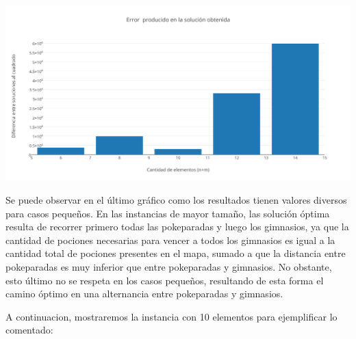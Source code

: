\vspace*{0.3cm} \vspace*{0.3cm}
  \begin{center}
\includegraphics[scale=0.40]{./EJ2/anillosdif.png}
  \end{center}
  \vspace*{0.3cm}

Se puede observar en el \'ultimo gr\'afico como los resultados tienen valores diversos para casos pequeños. En las instancias de mayor tamaño, las solución óptima resulta de recorrer primero todas las pokeparadas y luego los gimnasios, ya que la cantidad de pociones necesarias para vencer a todos los gimnasios es igual a la cantidad total de pociones presentes en el mapa, sumado a que la distancia entre pokeparadas es muy inferior que entre pokeparadas y gimnasios.
No obstante, esto último no se respeta en los casos pequeños, resultando de esta forma el camino óptimo en una alternancia entre pokeparadas y gimnasios.

A continuacion, mostraremos la instancia con 10 elementos para ejemplificar lo comentado:\\\\\\\\\\\\\\\\\

